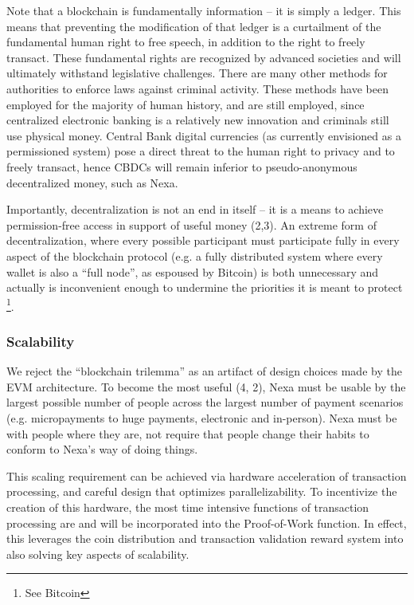 \documentclass[a4paper, 11pt]{article}
\begin{document}
Note that a blockchain is fundamentally information – it is simply a ledger.  This means that preventing the modification of that ledger is a curtailment of the fundamental human right to free speech, in addition to the right to freely transact. These fundamental rights are recognized by advanced societies and will ultimately withstand legislative challenges.  There are many other methods for authorities to enforce laws against criminal activity.  These methods have been employed for the majority of human history, and are still employed, since centralized electronic banking is a relatively new innovation and criminals still use physical money. Central Bank digital currencies (as currently envisioned as a permissioned system) pose a direct threat to the human right to privacy and to freely transact, hence CBDCs will remain inferior to pseudo-anonymous decentralized money, such as Nexa.

	Importantly, decentralization is not an end in itself – it is a means to achieve permission-free access in support of useful money (2,3).  An extreme form of decentralization, where every possible participant must participate fully in every aspect of the blockchain protocol (e.g. a fully distributed system where every wallet is also a “full node”,  as espoused by Bitcoin) is both unnecessary and actually is inconvenient enough to undermine the priorities it is meant to protect \footnote{ See Bitcoin}.

\subsubsection{Scalability}
We reject the “blockchain trilemma” as an artifact of design choices made by the EVM architecture.  To become the most useful (4, 2), Nexa must be usable by the largest possible number of people across the largest number of payment scenarios (e.g. micropayments to huge payments, electronic and in-person).  Nexa must be with people where they are, not require that people change their habits to conform to Nexa’s way of doing things.

	This scaling requirement can be achieved via hardware acceleration of transaction processing, and careful design that optimizes parallelizability.  To incentivize the creation of this hardware, the most time intensive functions of transaction processing are and will be incorporated into the Proof-of-Work function.  In effect, this leverages the coin distribution and transaction validation reward system into also solving key aspects of scalability.
\end{document}
